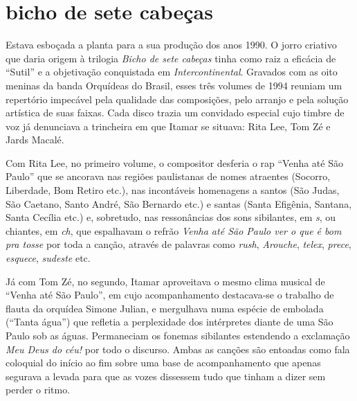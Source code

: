 \section{bicho de sete cabeças}

Estava esboçada a planta para a sua produção dos anos 1990. O jorro
criativo que daria origem à trilogia \textit{Bicho de sete cabeças} tinha como raiz
a eficácia de ``Sutil'' e a objetivação conquistada em \textit{Intercontinental}.
Gravados com as oito meninas da banda Orquídeas do Brasil, esses três
volumes de 1994 reuniam um repertório impecável pela qualidade das
composições, pelo arranjo e pela solução artística de suas faixas. Cada
disco trazia um convidado especial cujo timbre de voz já denunciava a
trincheira em que Itamar se situava: Rita Lee, Tom Zé e Jards Macalé.

Com Rita Lee, no primeiro volume, o compositor desferia o rap ``Venha até
São Paulo'' que se ancorava nas regiões paulistanas de nomes atraentes (Socorro, Liberdade, Bom Retiro etc.), nas incontáveis homenagens a
santos (São Judas, São Caetano, Santo André, São Bernardo etc.) e santas
(Santa Efigênia, Santana, Santa Cecília etc.) e, sobretudo, nas
ressonâncias dos sons sibilantes, em \textit{s}, ou chiantes, em \textit{ch}, que
espalhavam o refrão \textit{Venha até São Paulo ver o que é bom pra tosse}
por toda a canção, através de palavras como \textit{rush}, \textit{Arouche},
\textit{telex}, \textit{prece}, \textit{esquece}, \textit{sudeste} etc.

Já com Tom Zé, no segundo, Itamar aproveitava o mesmo clima musical de
``Venha até São Paulo'', em cujo acompanhamento destacava-se o trabalho de
flauta da orquídea Simone Julian, e mergulhava numa espécie de embolada
(``Tanta água'') que refletia a perplexidade dos intérpretes diante de uma
São Paulo sob as águas. Permaneciam os fonemas sibilantes estendendo a
exclamação \textit{Meu Deus do céu!} por todo o discurso. Ambas as canções
são entoadas como fala coloquial do início ao fim sobre uma base de
acompanhamento que apenas segurava a levada para que as vozes dissessem
tudo que tinham a dizer sem perder o ritmo.

